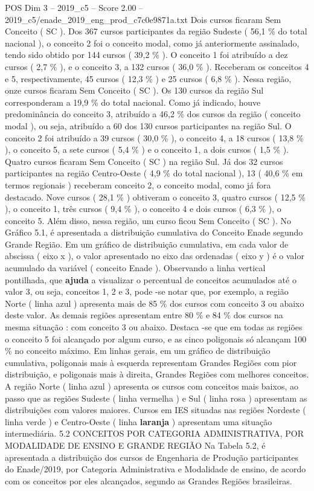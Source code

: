 \begin{textsample}{POS Dim 3 – 2019\_c5 – Score 2.00 – 2019\_c5/enade\_2019\_eng\_prod\_c7c0e9871a.txt}
Dois cursos ficaram Sem Conceito ( SC ).
Dos 367 cursos participantes da região Sudeste ( 56,1 \% do total nacional ), o conceito 2 foi o conceito modal, como já anteriormente assinalado, tendo sido obtido por 144 cursos ( 39,2 \% ).
O conceito 1 foi atribuído a dez cursos ( 2,7 \% ), e o conceito 3, a 132 cursos ( 36,0 \% ).
Receberam os conceitos 4 e 5, respectivamente, 45 cursos ( 12,3 \% ) e 25 cursos ( 6,8 \% ).
Nessa região, onze cursos ficaram Sem Conceito ( SC ).
Os 130 cursos da região Sul corresponderam a 19,9 \% do total nacional.
Como já indicado, houve predominância do conceito 3, atribuído a 46,2 \% dos cursos da região ( conceito modal ), ou seja, atribuído a 60 dos 130 cursos participantes na região Sul.
O conceito 2 foi atribuído a 39 cursos ( 30,0 \% ), o conceito 4, a 18 cursos ( 13,8 \% ), o conceito 5, a sete cursos ( 5,4 \% ) e o conceito 1, a dois cursos ( 1,5 \% ).
Quatro cursos ficaram Sem Conceito ( SC ) na região Sul.
Já dos 32 cursos participantes na região Centro-Oeste ( 4,9 \% do total nacional ), 13 ( 40,6 \% em termos regionais ) receberam conceito 2, o conceito modal, como já fora destacado.
Nove cursos ( 28,1 \% ) obtiveram o conceito 3, quatro cursos ( 12,5 \% ), o conceito 1, três cursos ( 9,4 \% ), o conceito 4 e dois cursos ( 6,3 \% ), o conceito 5.
Além disso, nessa região, um curso ficou Sem Conceito ( SC ).
No Gráfico 5.1, é apresentada a distribuição cumulativa do Conceito Enade segundo Grande Região.
Em um gráfico de distribuição cumulativa, em cada valor de abscissa ( eixo x ), o valor apresentado no eixo das ordenadas ( eixo y ) é o valor acumulado da variável ( conceito Enade ).
Observando a linha vertical pontilhada, que \textbf{ajuda} a visualizar o percentual de conceitos acumulados até o valor 3, ou seja, conceitos 1, 2 e 3, pode -se notar que, por exemplo, a região Norte ( linha azul ) apresenta mais de 85 \% dos cursos com conceito 3 ou abaixo deste valor.
As demais regiões apresentam entre 80 \% e 84 \% dos cursos na mesma situação : com conceito 3 ou abaixo.
Destaca -se que em todas as regiões o conceito 5 foi alcançado por algum curso, e as cinco poligonais só alcançam 100 \% no conceito máximo.
Em linhas gerais, em um gráfico de distribuição cumulativa, poligonais mais à esquerda representam Grandes Regiões com pior distribuição, e poligonais mais à direita, Grandes Regiões com melhores conceitos.
A região Norte ( linha azul ) apresenta os cursos com conceitos mais baixos, ao passo que as regiões Sudeste ( linha vermelha ) e Sul ( linha rosa ) apresentam as distribuições com valores maiores.
Cursos em IES situadas nas regiões Nordeste ( linha verde ) e Centro-Oeste ( linha \textbf{laranja} ) apresentam uma situação intermediária. 5.2 CONCEITOS POR CATEGORIA ADMINISTRATIVA, POR MODALIDADE DE ENSINO E GRANDE REGIÃO Na Tabela 5.2, é apresentada a distribuição dos cursos de Engenharia de Produção participantes do Enade/2019, por Categoria Administrativa e Modalidade de ensino, de acordo com os conceitos por eles alcançados, segundo as Grandes Regiões brasileiras.

\end{textsample}
